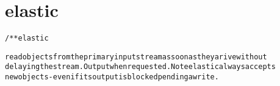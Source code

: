 \section{elastic}
\begin{shaded}
\begin{alltt}
/** elastic

read objects from the primary input stream as soon as they arive without
delaying the stream.  Output when requested.  Note elastic always accepts
new objects - even if its output is blocked pending a write.

\end{alltt}
\end{shaded}
